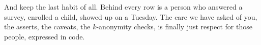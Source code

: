 \documentclass[
    a4paper,
    fontsize=10pt,
    twoside=true,
    numbers=noenddot,
]{kaobook}
\begin{document}
And keep the last habit of all. Behind every row is a person who answered a survey, enrolled a child, showed up on a Tuesday. The care we have asked of you, the asserts, the caveats, the $k$-anonymity checks, is finally just respect for those people, expressed in code.

\printbibliography[heading=bibintoc, title=Bibliography]

\printindex
\end{document}

